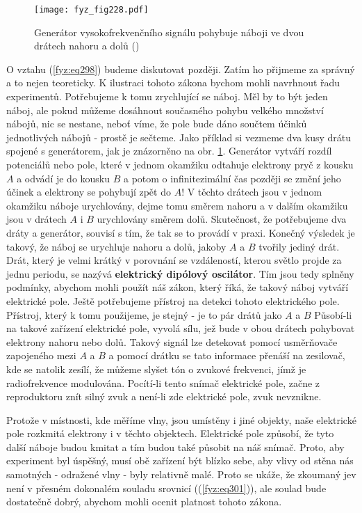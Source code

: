 {    \begin{figure}[ht!] %
      \centering
      \texttt{[image: fyz\_fig228.pdf]}
      \caption{Generátor vysokofrekvenčního signálu pohybuje náboji ve dvou drátech nahoru a dolů
               (\cite[s.~375]{Feynman01})}
      \label{fyz:fig228}
    \end{figure}
    
    O vztahu (\ref{fyz:eq298}) budeme diskutovat později. Zatím ho přijmeme za správný a to nejen 
    teoreticky. K ilustraci tohoto zákona bychom mohli navrhnout řadu experimentů. Potřebujeme k 
    tomu zrychlující se náboj. Měl by to být jeden náboj, ale pokud můžeme dosáhnout současného 
    pohybu velkého množství nábojů, nic se nestane, neboť víme, že pole bude dáno součtem účinků 
    jednotlivých nábojů - prostě je sečteme. Jako příklad si vezmeme dva kusy drátu spojené s 
    generátorem, jak je znázorněno na obr. \ref{fyz:fig228}. Generátor vytváří rozdíl potenciálů 
    nebo pole, které v jednom okamžiku odtahuje elektrony pryč z kousku \(A\) a odvádí je do kousku 
    \(B\) a potom o infinitezimální čas později se změní jeho účinek a elektrony se pohybují zpět 
    do \(A\)! V těchto drátech jsou v jednom okamžiku náboje urychlovány, dejme tomu směrem nahoru 
    a v dalším okamžiku jsou v drátech \(A\) i \(B\) urychlovány směrem dolů. Skutečnost, že 
    potřebujeme dva dráty a generátor, souvisí s tím, že tak se to provádí v praxi. Konečný 
    výsledek je takový, že náboj se urychluje nahoru a dolů, jakoby \(A\) a \(B\) tvořily jediný 
    drát. Drát, který je velmi krátký v porovnání se vzdáleností, kterou světlo projde za jednu 
    periodu, se nazývá \textbf{elektrický dipólový oscilátor}. Tím jsou tedy splněny podmínky, 
    abychom mohli použít náš zákon, který říká, že takový náboj vytváří elektrické pole. Ještě 
    potřebujeme přístroj na detekci tohoto elektrického pole. Přístroj, který k tomu použijeme, je 
    stejný - je to pár drátů jako \(A\) a \(B\) Působí-li na takové zařízení elektrické pole, 
    vyvolá sílu, jež bude v obou drátech pohybovat elektrony nahoru nebo dolů. Takový signál lze 
    detekovat pomocí usměrňovače zapojeného mezi \(A\) a \(B\) a pomocí drátku se tato informace 
    přenáší na zesilovač, kde se natolik zesílí, že můžeme slyšet tón o zvukové frekvenci, jímž je 
    radiofrekvence modulována. Pocítí-li tento snímač elektrické pole, začne z reproduktoru znít 
    silný zvuk a není-li zde elektrické pole, zvuk nevznikne.

    Protože v místnosti, kde měříme vlny, jsou umístěny i jiné objekty, naše elektrické pole 
    rozkmitá elektrony i v těchto objektech. Elektrické pole způsobí, že tyto další náboje budou 
    kmitat a tím budou také působit na náš snímač. Proto, aby experiment byl úspěšný, musí obě 
    zařízení být blízko sebe, aby vlivy od stěna nás samotných - odražené vlny - byly relativně 
    malé. Proto se ukáže, že zkoumaný jev není v přesném dokonalém souladu srovnicí 
    ((\ref{fyz:eq301})), ale soulad bude dostatečně dobrý, abychom mohli ocenit platnost tohoto 
    zákona.
    
}
